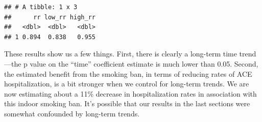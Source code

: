 \documentclass[
]{book}
\newenvironment{Shaded}{\begin{snugshade}}{\end{snugshade}}
\newcommand{\DataTypeTok}[1]{\textcolor[rgb]{0.13,0.29,0.53}{#1}}
\newcommand{\DecValTok}[1]{\textcolor[rgb]{0.00,0.00,0.81}{#1}}
\newcommand{\FloatTok}[1]{\textcolor[rgb]{0.00,0.00,0.81}{#1}}
\newcommand{\KeywordTok}[1]{\textcolor[rgb]{0.13,0.29,0.53}{\textbf{#1}}}
\newcommand{\NormalTok}[1]{#1}
\newcommand{\OperatorTok}[1]{\textcolor[rgb]{0.81,0.36,0.00}{\textbf{#1}}}
\newcommand{\StringTok}[1]{\textcolor[rgb]{0.31,0.60,0.02}{#1}}
\begin{document}
\begin{Shaded}
\end{Shaded}

\begin{verbatim}
## # A tibble: 1 x 3
##      rr low_rr high_rr
##   <dbl>  <dbl>   <dbl>
## 1 0.894  0.838   0.955
\end{verbatim}

These results show us a few things. First, there is clearly a long-term time trend---the p value on the ``time'' coefficient estimate is much lower than 0.05. Second, the estimated benefit from the smoking ban, in terms of reducing rates of ACE hospitalization, is a bit stronger when we control for long-term trends. We are now estimating about a 11\% decrease in hospitalization rates in association with this indoor smoking ban. It's possible that our results in the last sections were somewhat confounded by long-term trends.
\end{document}
